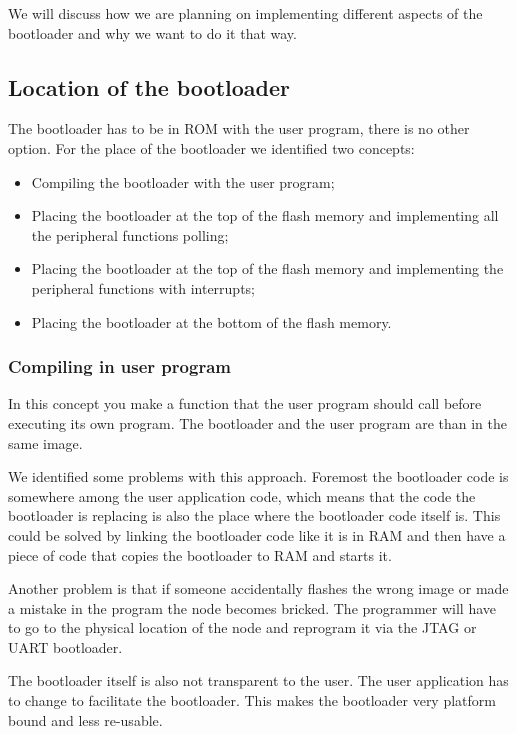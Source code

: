 \documentclass[twocolumn]{article}
\begin{document}
		We will discuss how we are planning on implementing different aspects of the bootloader and why we want to do it that way.
	
	\subsection*{Location of the bootloader}
		The bootloader has to be in ROM with the user program, there is no other option.
		For the place of the bootloader we identified two concepts:
		\begin{itemize}
			\item Compiling the bootloader with the user program;
			\item Placing the bootloader at the top of the flash memory and implementing all the peripheral functions polling;
			\item Placing the bootloader at the top of the flash memory and implementing the peripheral functions with interrupts;
			\item Placing the bootloader at the bottom of the flash memory.
		\end{itemize}
		
		\subsubsection*{Compiling in user program}
			In this concept you make a function that the user program should call before executing its own program.
			The bootloader and the user program are than in the same image.
			
			We identified some problems with this approach.
			Foremost the bootloader code is somewhere among the user application code,
			which means that the code the bootloader is replacing is also the place where the bootloader code itself is.
			This could be solved by linking the bootloader code like it is in RAM and then have a piece of code that copies the bootloader to RAM and starts it.
			
			Another problem is that if someone accidentally flashes the wrong image or made a mistake in the program the node becomes bricked.
			The programmer will have to go to the physical location of the node and reprogram it via the JTAG or UART bootloader.
			
			The bootloader itself is also not transparent to the user.
			The user application has to change to facilitate the bootloader.
			This makes the bootloader very platform bound and less re-usable.
		
\end{document}
